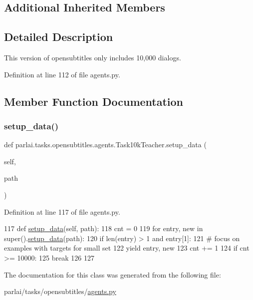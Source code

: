 \subsection*{Additional Inherited Members}


\subsection{Detailed Description}
\begin{DoxyVerb}This version of opensubtitles only includes 10,000 dialogs.
\end{DoxyVerb}
 

Definition at line 112 of file agents.\+py.



\subsection{Member Function Documentation}
\mbox{\label{classparlai_1_1tasks_1_1opensubtitles_1_1agents_1_1Task10kTeacher_a2e336eeab89568e9d1bd316e401e9dc1}} 
\subsubsection{\texorpdfstring{setup\+\_\+data()}{setup\_data()}}
{\footnotesize\ttfamily def parlai.\+tasks.\+opensubtitles.\+agents.\+Task10k\+Teacher.\+setup\+\_\+data (\begin{DoxyParamCaption}\item[{}]{self,  }\item[{}]{path }\end{DoxyParamCaption})}



Definition at line 117 of file agents.\+py.


\begin{DoxyCode}
117     \textcolor{keyword}{def }\hyperlink{namespaceparlai_1_1tasks_1_1multinli_1_1agents_a4fa2cb0ba1ed745336ad8bceed36b841}{setup\_data}(self, path):
118         cnt = 0
119         \textcolor{keywordflow}{for} entry, new \textcolor{keywordflow}{in} super().\hyperlink{namespaceparlai_1_1tasks_1_1multinli_1_1agents_a4fa2cb0ba1ed745336ad8bceed36b841}{setup\_data}(path):
120             \textcolor{keywordflow}{if} len(entry) > 1 \textcolor{keywordflow}{and} entry[1]:
121                 \textcolor{comment}{# focus on examples with targets for small set}
122                 \textcolor{keywordflow}{yield} entry, new
123             cnt += 1
124             \textcolor{keywordflow}{if} cnt >= 10000:
125                 \textcolor{keywordflow}{break}
126 
127 
\end{DoxyCode}


The documentation for this class was generated from the following file\+:\begin{DoxyCompactItemize}
\item 
parlai/tasks/opensubtitles/\hyperlink{parlai_2tasks_2opensubtitles_2agents_8py}{agents.\+py}\end{DoxyCompactItemize}
